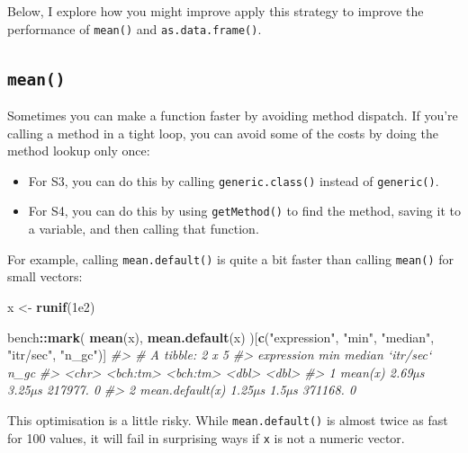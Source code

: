 \documentclass[]{book}
\makeatletter
\newenvironment{Shaded}{\begin{snugshade}}{\end{snugshade}}
\newcommand{\CommentTok}[1]{\textcolor[rgb]{0.37,0.37,0.37}{\textit{#1}}}
\newcommand{\FloatTok}[1]{\textcolor[rgb]{0.06,0.06,0.06}{#1}}
\newcommand{\KeywordTok}[1]{\textcolor[rgb]{0.27,0.27,0.27}{\textbf{#1}}}
\newcommand{\NormalTok}[1]{#1}
\newcommand{\OperatorTok}[1]{\textcolor[rgb]{0.43,0.43,0.43}{\textbf{#1}}}
\newcommand{\StringTok}[1]{\textcolor[rgb]{0.5,0.5,0.5}{#1}}
\newcommand{\indexc}[1]{\index{#1@\texttt{#1}}}
\makeatother
\begin{document}
Below, I explore how you might improve apply this strategy to improve the performance of \texttt{mean()} and \texttt{as.data.frame()}.

\hypertarget{mean}{%
\subsection{\texorpdfstring{\texttt{mean()}}{mean()}}\label{mean}}

\indexc{.Internal()}


Sometimes you can make a function faster by avoiding method dispatch. If you're calling a method in a tight loop, you can avoid some of the costs by doing the method lookup only once:

\begin{itemize}
\item
  For S3, you can do this by calling \texttt{generic.class()} instead of \texttt{generic()}.
\item
  For S4, you can do this by using \texttt{getMethod()} to find the method, saving
  it to a variable, and then calling that function.
\end{itemize}

For example, calling \texttt{mean.default()} is quite a bit faster than calling \texttt{mean()} for small vectors:

\begin{Shaded}
\begin{Highlighting}[]
\NormalTok{x <-}\StringTok{ }\KeywordTok{runif}\NormalTok{(}\FloatTok{1e2}\NormalTok{)}

\NormalTok{bench}\OperatorTok{::}\KeywordTok{mark}\NormalTok{(}
  \KeywordTok{mean}\NormalTok{(x),}
  \KeywordTok{mean.default}\NormalTok{(x)}
\NormalTok{)[}\KeywordTok{c}\NormalTok{(}\StringTok{"expression"}\NormalTok{, }\StringTok{"min"}\NormalTok{, }\StringTok{"median"}\NormalTok{, }\StringTok{"itr/sec"}\NormalTok{, }\StringTok{"n_gc"}\NormalTok{)]}
\CommentTok{#> # A tibble: 2 x 5}
\CommentTok{#>   expression           min   median `itr/sec`  n_gc}
\CommentTok{#>   <chr>           <bch:tm> <bch:tm>     <dbl> <dbl>}
\CommentTok{#> 1 mean(x)           2.69µs   3.25µs   217977.     0}
\CommentTok{#> 2 mean.default(x)   1.25µs    1.5µs   371168.     0}
\end{Highlighting}
\end{Shaded}

This optimisation is a little risky. While \texttt{mean.default()} is almost twice as fast for 100 values, it will fail in surprising ways if \texttt{x} is not a numeric vector.
\end{document}
